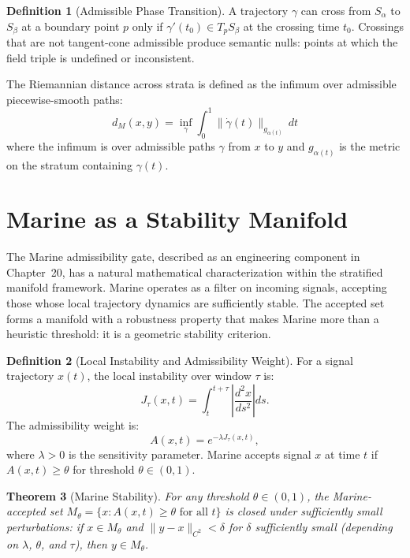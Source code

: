 \documentclass[12pt, oneside]{book}
\theoremstyle{flyxion}
\newtheorem{theorem}{Theorem}[chapter]
\theoremstyle{definition}
\newtheorem{definition}[theorem]{Definition}
\begin{document}
\begin{definition}[Admissible Phase Transition]
A trajectory $\gamma$ can cross from $S_\alpha$ to
$S_\beta$ at a boundary point $p$ only if $\gamma'(t_0)
\in T_p S_\beta$ at the crossing time $t_0$. Crossings
that are not tangent-cone admissible produce semantic
nulls: points at which the field triple is undefined
or inconsistent.
\end{definition}

The Riemannian distance across strata is defined as the
infimum over admissible piecewise-smooth paths:
\[
d_M(x, y) = \inf_\gamma \int_0^1 \|\dot\gamma(t)\|_{g_{\alpha(t)}}\,dt
\]
where the infimum is over admissible paths $\gamma$
from $x$ to $y$ and $g_{\alpha(t)}$ is the metric on
the stratum containing $\gamma(t)$.

\section{Marine as a Stability Manifold}

The Marine admissibility gate, described as an engineering
component in Chapter~20, has a natural mathematical
characterization within the stratified manifold framework.
Marine operates as a filter on incoming signals, accepting
those whose local trajectory dynamics are sufficiently
stable. The accepted set forms a manifold with a robustness
property that makes Marine more than a heuristic threshold:
it is a geometric stability criterion.

\begin{definition}[Local Instability and Admissibility Weight]
For a signal trajectory $x(t)$, the local instability over
window $\tau$ is:
\[
J_\tau(x, t) = \int_t^{t+\tau} \left|\frac{d^2 x}{ds^2}
\right| ds.
\]
The admissibility weight is:
\[
A(x, t) = e^{-\lambda J_\tau(x,t)},
\]
where $\lambda > 0$ is the sensitivity parameter. Marine
accepts signal $x$ at time $t$ if $A(x,t) \geq \theta$
for threshold $\theta \in (0,1)$.
\end{definition}

\begin{theorem}[Marine Stability]
\label{thm:marine_stability}
For any threshold $\theta \in (0,1)$, the Marine-accepted
set $M_\theta = \{x : A(x,t) \geq \theta \text{ for all }
t\}$ is closed under sufficiently small perturbations: if
$x \in M_\theta$ and $\|y - x\|_{C^2} < \delta$ for
$\delta$ sufficiently small (depending on $\lambda$,
$\theta$, and $\tau$), then $y \in M_\theta$.
\end{theorem}
\end{document}
